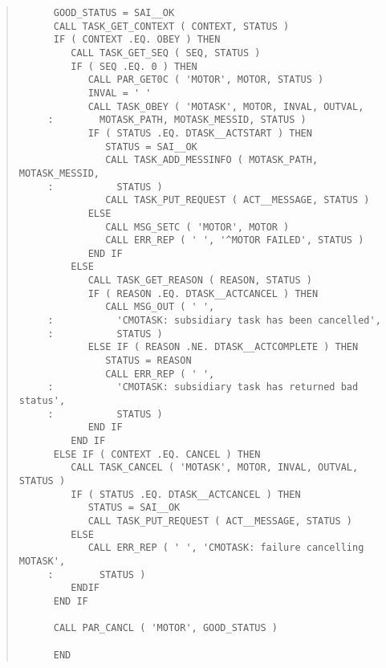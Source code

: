 \begin{quote}
\begin{verbatim}
      GOOD_STATUS = SAI__OK
      CALL TASK_GET_CONTEXT ( CONTEXT, STATUS )
      IF ( CONTEXT .EQ. OBEY ) THEN
         CALL TASK_GET_SEQ ( SEQ, STATUS )
         IF ( SEQ .EQ. 0 ) THEN
            CALL PAR_GET0C ( 'MOTOR', MOTOR, STATUS )
            INVAL = ' '
            CALL TASK_OBEY ( 'MOTASK', MOTOR, INVAL, OUTVAL,
     :        MOTASK_PATH, MOTASK_MESSID, STATUS )
            IF ( STATUS .EQ. DTASK__ACTSTART ) THEN
               STATUS = SAI__OK
               CALL TASK_ADD_MESSINFO ( MOTASK_PATH, MOTASK_MESSID, 
     :           STATUS )          
               CALL TASK_PUT_REQUEST ( ACT__MESSAGE, STATUS )
            ELSE
               CALL MSG_SETC ( 'MOTOR', MOTOR )
               CALL ERR_REP ( ' ', '^MOTOR FAILED', STATUS )
            END IF
         ELSE 
            CALL TASK_GET_REASON ( REASON, STATUS )
            IF ( REASON .EQ. DTASK__ACTCANCEL ) THEN
               CALL MSG_OUT ( ' ',
     :           'CMOTASK: subsidiary task has been cancelled',
     :           STATUS )
            ELSE IF ( REASON .NE. DTASK__ACTCOMPLETE ) THEN
               STATUS = REASON
               CALL ERR_REP ( ' ',
     :           'CMOTASK: subsidiary task has returned bad status',
     :           STATUS )
            END IF
         END IF
      ELSE IF ( CONTEXT .EQ. CANCEL ) THEN
         CALL TASK_CANCEL ( 'MOTASK', MOTOR, INVAL, OUTVAL, STATUS )
         IF ( STATUS .EQ. DTASK__ACTCANCEL ) THEN
            STATUS = SAI__OK
            CALL TASK_PUT_REQUEST ( ACT__MESSAGE, STATUS )
         ELSE
            CALL ERR_REP ( ' ', 'CMOTASK: failure cancelling MOTASK', 
     :        STATUS )
         ENDIF
      END IF

      CALL PAR_CANCL ( 'MOTOR', GOOD_STATUS )

      END

\end{verbatim} \end{quote} \normalsize

